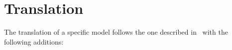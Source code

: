 
\section{\SCXML Translation}
\label{sec:translation}

The translation of a specific \SCXML model follows the one described
in~\cite{MoSn16,MoSnHo18} with the following additions:




